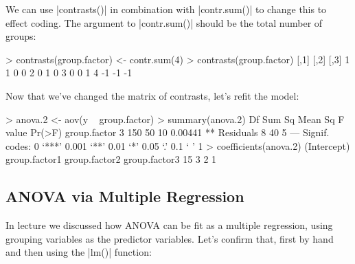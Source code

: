 We can  use |contrasts()| in combination with |contr.sum()| to change this to effect coding. The argument to |contr.sum()| should be the total number of groups:
%
\begin{R}
> contrasts(group.factor) <- contr.sum(4)
> contrasts(group.factor)
  [,1] [,2] [,3]
1    1    0    0
2    0    1    0
3    0    0    1
4   -1   -1   -1
\end{R}
%
Now that we've changed the matrix of contrasts, let's refit the model:
\begin{R}
> anova.2 <- aov(y ~ group.factor)
> summary(anova.2)
             Df Sum Sq Mean Sq F value  Pr(>F)   
group.factor  3    150      50      10 0.00441 **
Residuals     8     40       5                   
---
Signif. codes:  0 ‘***’ 0.001 ‘**’ 0.01 ‘*’ 0.05 ‘.’ 0.1 ‘ ’ 1 
> coefficients(anova.2)
  (Intercept) group.factor1 group.factor2 group.factor3 
           15             3             2             1 
\end{R}

\subsection{ANOVA via Multiple Regression}

In lecture we discussed how ANOVA can be fit as a multiple regression, using grouping variables as the predictor variables.  Let's confirm that, first by hand and then using the |lm()| function:

